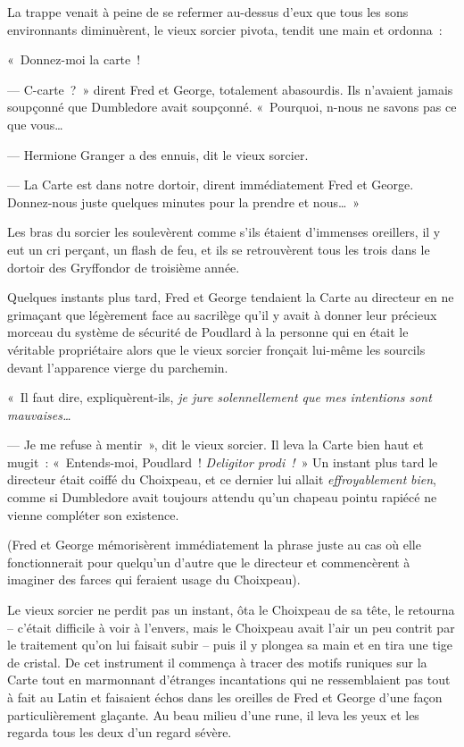 La trappe venait à peine de se refermer au-dessus d'eux que tous les sons environnants diminuèrent, le vieux sorcier pivota, tendit une main et ordonna~:

«~Donnez-moi la carte~!

--- C-carte~?~» dirent Fred et George, totalement abasourdis. Ils n'avaient jamais soupçonné que Dumbledore avait soupçonné. «~Pourquoi, n-nous ne savons pas ce que vous…

--- Hermione Granger a des ennuis, dit le vieux sorcier.

--- La Carte est dans notre dortoir, dirent immédiatement Fred et George. Donnez-nous juste quelques minutes pour la prendre et nous…~»

Les bras du sorcier les soulevèrent comme s'ils étaient d'immenses oreillers, il y eut un cri perçant, un flash de feu, et ils se retrouvèrent tous les trois dans le dortoir des Gryffondor de troisième année.

Quelques instants plus tard, Fred et George tendaient la Carte au directeur en ne grimaçant que légèrement face au sacrilège qu'il y avait à donner leur précieux morceau du système de sécurité de Poudlard à la personne qui en était le véritable propriétaire alors que le vieux sorcier fronçait lui-même les sourcils devant l'apparence vierge du parchemin.

«~Il faut dire, expliquèrent-ils, \emph{je jure solennellement que mes intentions sont mauvaises…}

--- Je me refuse à mentir~», dit le vieux sorcier. Il leva la Carte bien haut et mugit~: «~Entends-moi, Poudlard~! \emph{Deligitor prodi~!}~» Un instant plus tard le directeur était coiffé du Choixpeau, et ce dernier lui allait \emph{effroyablement} \emph{bien}, comme si Dumbledore avait toujours attendu qu'un chapeau pointu rapiécé ne vienne compléter son existence.

(Fred et George mémorisèrent immédiatement la phrase juste au cas où elle fonctionnerait pour quelqu'un d'autre que le directeur et commencèrent à imaginer des farces qui feraient usage du Choixpeau).

Le vieux sorcier ne perdit pas un instant, ôta le Choixpeau de sa tête, le retourna -- c'était difficile à voir à l'envers, mais le Choixpeau avait l'air un peu contrit par le traitement qu'on lui faisait subir -- puis il y plongea sa main et en tira une tige de cristal. De cet instrument il commença à tracer des motifs runiques sur la Carte tout en marmonnant d'étranges incantations qui ne ressemblaient pas tout à fait au Latin et faisaient échos dans les oreilles de Fred et George d'une façon particulièrement glaçante. Au beau milieu d'une rune, il leva les yeux et les regarda tous les deux d'un regard sévère.

